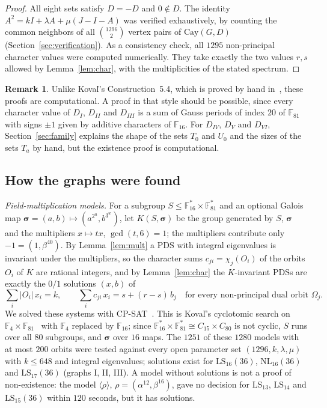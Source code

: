 \documentclass[11pt]{amsart}
\theoremstyle{definition}
\newtheorem{remark}[theorem]{Remark}
\newcommand{\F}{\mathbb{F}}
\newcommand{\Cay}{\mathrm{Cay}}
\newcommand{\LS}{\mathrm{LS}}
\newcommand{\NL}{\mathrm{NL}}
\begin{document}
\begin{proof}
All eight sets satisfy $D=-D$ and $0\notin D$. The identity $A^2=kI+\lambda A+\mu(J-I-A)$ was verified exhaustively, by counting the common neighbors of all $\binom{1296}{2}$ vertex pairs of $\Cay(G,D)$ (Section~\ref{sec:verification}). As a consistency check, all $1295$ non-principal character values were computed numerically. They take exactly the two values $r,s$ allowed by Lemma~\ref{lem:char}, with the multiplicities of the stated spectrum.
\end{proof}

\begin{remark}
Unlike Kova\v{l}'s Construction~5.4, which is proved by hand in~\cite[Section~5.3]{KovalNew}, these proofs are computational. A proof in that style should be possible, since every character value of $D_I$, $D_{II}$ and $D_{III}$ is a sum of Gauss periods of index $20$ of $\F_{81}$ with signs $\pm1$ given by additive characters of $\F_{16}$.
For $D_{IV}$, $D_V$ and $D_{VI}$, Section~\ref{sec:family} explains the shape of the sets $T_0$ and $U_0$ and the sizes of the sets $T_a$ by hand, but the existence proof is computational.
\end{remark}

\subsection{How the graphs were found}\label{sec:found}\label{sec:search}\label{sec:fibres}
\emph{Field-multiplication models.} For a subgroup $S\le\F_{16}^*\times\F_{81}^*$ and an optional Galois map $\boldsymbol\sigma=(a,b)\mapsto(a^{2^u},b^{3^w})$, let $K(S,\boldsymbol\sigma)$ be the group generated by $S$, $\boldsymbol\sigma$ and the multipliers $x\mapsto tx$, $\gcd(t,6)=1$; the multipliers contribute only $-1=(1,\beta^{40})$. By Lemma~\ref{lem:mult} a PDS with integral eigenvalues is invariant under the multipliers, so the character sums $c_{ji}=\chi_j(O_i)$ of the orbits $O_i$ of $K$ are rational integers, and by Lemma~\ref{lem:char} the $K$-invariant PDSs are exactly the $0/1$ solutions $(x,b)$ of
\[
\textstyle\sum_i|O_i|\,x_i=k,\qquad \sum_i c_{ji}\,x_i=s+(r-s)\,b_j\quad\text{for every non-principal dual orbit }\Omega_j.
\]
We solved these systems with CP-SAT~\cite{CPSAT}. This is Kova\v{l}'s cyclotomic search on $\F_4\times\F_{81}$~\cite[Section~5.4]{KovalNew} with $\F_4$ replaced by $\F_{16}$; since $\F_{16}^*\times\F_{81}^*\cong C_{15}\times C_{80}$ is not cyclic, $S$ runs over all $80$ subgroups, and $\boldsymbol\sigma$ over $16$ maps. The $1251$ of these $1280$ models with at most $200$ orbits were tested against every open parameter set $(1296,k,\lambda,\mu)$ with $k\le648$ and integral eigenvalues; solutions exist for $\LS_{16}(36)$, $\NL_{16}(36)$ and $\LS_{17}(36)$ (graphs I, II, III). A model without solutions is not a proof of non-existence: the model $\langle\rho\rangle$, $\rho=(\alpha^{12},\beta^{16})$, gave no decision for $\LS_{13}$, $\LS_{14}$ and $\LS_{15}(36)$ within $120$ seconds, but it has solutions.
\end{document}
